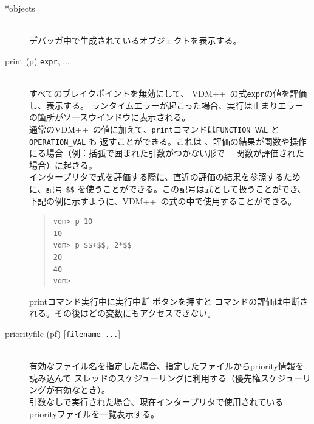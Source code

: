 \documentclass[\pformat,12pt]{jarticle}
\newcommand{\vdmslpp}{VDM++}
\newcommand{\guicmd}[1]{{\gt #1}}
\begin{document}
\begin{description}
\item[*objects] \mbox{}\\
  デバッガ中で生成されているオブジェクトを表示する。


\item[print (p) {\tt expr}, ...] \mbox{}\\
  すべてのブレイクポイントを無効にして、 \vdmslpp\ の式{\tt expr}の値を評価し、表示する。
  ランタイムエラーが起こった場合、実行は止まりエラーの箇所が\guicmd{ソースウインドウ}に表示される。\\
  
  通常の\vdmslpp\ の値に加えて、{\tt print}コマンドは{\tt FUNCTION\_VAL}  と{\tt OPERATION\_VAL} も
  返すことができる。これは 、評価の結果が関数や操作にる場合（例：括弧で囲まれた引数がつかない形で
　関数が評価された場合）に起きる。\\
  
  インタープリタで式を評価する際に、直近の評価の結果を参照するために、記号
   {\tt \$\$}\index{\$\$} を使うことができる。この記号は式として扱うことができ、
  下記の例に示すように、\vdmslpp\ の式の中で使用することができる。

\begin{quote}
\begin{verbatim}
vdm> p 10
10
vdm> p $$+$$, 2*$$
20
40
vdm> 
\end{verbatim}
\end{quote}

  printコマンド実行中に\guicmd{実行中断} ボタンを押すと
  コマンドの評価は中断される。その後はどの変数にもアクセスできない。
  
\item[priorityfile (pf) \mbox{[{\tt filename ...}]}]
  \mbox{}\\
  有効なファイル名を指定した場合、指定したファイルからpriority情報を読み込んで
  スレッドのスケジューリングに利用する（優先権スケジューリングが有効なとき）。\\

  引数なしで実行された場合、現在インタープリタで使用されているpriorityファイルを一覧表示する。\\


\end{description}
\end{document}
